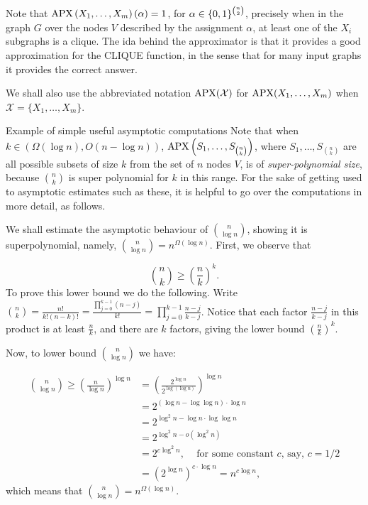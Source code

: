 Note that $\mathrm{APX}\left(X_1, \ldots, X_m\right)(\alpha)=1$, for $\alpha\in\{0,1\}^{n\choose 2}$, precisely when in the graph $G$ over the nodes $V$ described by the assignment $\alpha$, at least one of the $X_i$ subgraphs is a clique. The ida behind the approximator is that it provides a good approximation for the CLIQUE function, in the sense that for many  input graphs it provides the correct answer.   

We shall also use the abbreviated notation $\mathrm{APX}(\mathcal X)$ for $\mathrm{APX}(X_1,\dots,X_m)$ when $\mathcal X = \{X_1,\dots,X_m\}$.


\begin{trailer}{Example of simple useful asymptotic computations}
Note that when $k\in(\Omega(\log n),O(n-\log n))$, $\mathrm{APX}\left(S_1, \ldots, S_{n\choose k}\right)$, where $S_1,\dots,S_{n\choose k}$ are all possible subsets of size $k$ from the set of $n$ nodes $V$, is of \emph{super-polynomial size}, because $ n\choose k$ is super polynomial for $k$ in this range. For the sake of getting used to asymptotic estimates such as these, it is helpful to go over the computations in more detail, as follows.

We shall estimate the asymptotic behaviour of $\binom{n}{\log n} $, showing it is superpolynomial, namely, $\binom{n}{\log n} =
n^{\Omega(\log n)}$. First, we observe that

$$\binom{n}{k} \ge\left(\frac{n}{k}\right)^k. $$
To prove this lower bound we do the following.
Write $\binom{n}{k}=\frac{n!}{k!(n-k)!}=
\frac{\prod_{j=0}^{k-1}(n-j)}{k!}=\prod_{j=0}^{k-1} \frac{n-j}{k-j}$. Notice that each factor $\frac{n-j}{k-j}$ in this product is at least $\frac{n}{k}$, and there are $k$ factors, giving the lower bound $\left(\frac{n}{k}\right)^k$. 

Now, to lower bound $\binom{n}{\log n} $ we have:

\[  
\begin{aligned}
 \binom{n}{\log n} \geq\left(\frac{n}{\log n}\right)^{\log n}
& =
\left(
    \frac{2^{\log n}}
        {2^{\log (\log n)}}\right)^{\log n} \\
& =2^{(\log n-\log \log n) \cdot \log n} \\
& =2^{\log^2n-\log n \cdot \log \log n} \\
& =2^{\log ^2 n-o(\log ^2n)} \\
& = 2^{c \log ^2 n} \text {, ~~~for some constant $c$, say, $c=1/2$} \\
& =\left(2^{\log n}\right)^{c \cdot \log n}=
n^{c \log n},
\end{aligned}
\]
which means that $\binom{n}{\log n}= n^{\Omega(\log n)}$.




\end{trailer}
